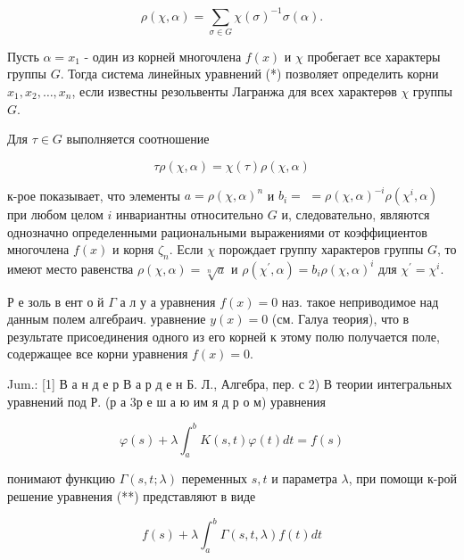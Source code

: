 \documentclass[10pt]{article}
\begin{document}
\[

\rho(\chi, \alpha)=\sum_{\sigma \in G} \chi(\sigma)^{-1} \sigma(\alpha) .

\]



Пусть $\alpha=x_{1}$ - один из корней многочлена $f(x)$ и $\chi$ пробегает все характеры группы $G$. Тогда система линейных уравнений (*) позволяет определить корни $x_{1}, x_{2}, \ldots, x_{n}$, если известны резольвенты Лагранжа для всех характерөв $\chi$ группы $G$.



Для $\tau \in G$ выполняется соотношение



\[

\tau \rho(\chi, \alpha)=\chi(\tau) \rho(\chi, \alpha)

\]



к-рое показывает, что элементы $a=\rho(\chi, \alpha)^{n}$ и $b_{i}=$ $=\rho(\chi, \alpha)^{-i} \rho\left(\chi^{i}, \alpha\right)$ при любом целом $i$ инвариантны относительно $G$ и, следовательно, являются однозначно определенными рациональными выражениями от коэффициентов многочлена $f(x)$ и корня $\zeta_{n}$. Если $\chi$ порождает группу характеров группы $G$, то имеют место равенства $\rho(\chi, \alpha)=\sqrt[n]{a}$ и $\rho\left(\chi^{\prime}, \alpha\right)=b_{i} \rho(\chi, \alpha)^{i}$ для $\chi^{\prime}=\chi^{i}$.



Р е золь в ент о й $\Gamma$ а л у а уравнения $f(x)=0$ наз. такое неприводимое над данным полем алгебраич. уравнение $y(x)=0$ (см. Галуа теория), что в результате присоединения одного из его корней к этому полю получается поле, содержащее все корни уравнения $f(x)=0$.



Jum.: [1] В а н д е р В а р д е н Б. Л., Алгебра, пер. с 2) В теории интегральных уравнений под Р. (р а 3р е ш а ю им я д р о м) уравнения



\[

\varphi(s)+\lambda \int_{a}^{b} K(s, t) \varphi(t) d t=f(s)

\]



понимают функцию $\Gamma(s, t ; \lambda)$ переменных $s, t$ и параметра $\lambda$, при помощи к-рой решение уравнения (**) представляют в виде



\[

f(s)+\lambda \int_{a}^{b} \Gamma(s, t, \lambda) f(t) d t

\]
\end{document}
